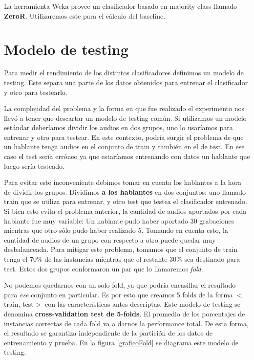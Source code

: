 La herramienta Weka provee un clasificador basado en majority class llamado \textbf{ZeroR}. Utilizaremos este para el cálculo del baseline. 

\section{Modelo de testing}

Para medir el rendimiento de los distintos clasificadores definimos un modelo de testing. Este separa una parte de los datos obtenidos para entrenar el clasificador y otro para testearlo.

La complejidad del problema y la forma en que fue realizado el experimento nos llevó a tener que descartar un modelo de testing común. Si utilizamos un modelo estándar deberíamos dividir los audios en dos grupos, uno lo usaríamos para entrenar y otro para testear. En este contexto, podría surgir el problema de que un hablante tenga audios en el conjunto de train y también en el de test. En ese caso el test sería erróneo ya que estaríamos entrenando con datos un hablante que luego sería testeado.

Para evitar este inconveniente debimos tomar en cuenta los hablantes a la hora de dividir los grupos. Dividimos \textbf{a los hablantes} en dos conjuntos: uno llamado train que se utiliza para entrenar, y otro test que testea el clasificador entrenado. Si bien esto evita el problema anterior, la cantidad de audios aportados por cada hablante fue muy variable: Un hablante pudo haber aportado 30 grabaciones mientras que otro sólo pudo haber realizado 5. Tomando en cuenta esto, la cantidad de audios de un grupo con respecto a otro puede quedar muy desbalanceada. Para mitigar este problema, tomamos que el conjunto de train tenga el 70\% de las instancias mientras que el restante 30\% sea destinado para test. Estos dos grupos conformaron un par que lo llamaremos \textit{fold}.

No podemos quedarnos con un solo fold, ya que podría encasillar el resultado para \textit{ese} conjunto en particular. Es por esto que creamos 5 folds de la forma $<$train, test$>$ con las características antes descriptas. Este modelo de testing se denomina \textbf{cross-validation test de 5-folds}. El promedio de los porcentajes de instancias correctas de cada fold va a darnos la performance total. De esta forma, el resultado se garantiza independiente de la partición de los datos de entrenamiento y prueba. En la figura \ref{graficoFold} se diagrama este modelo de testing.

